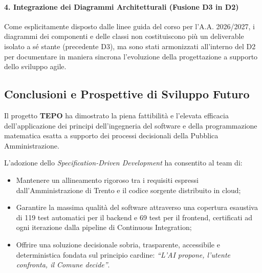 \paragraph{4. Integrazione dei Diagrammi Architetturali (Fusione D3 in D2)}
Come esplicitamente disposto dalle linee guida del corso per l'A.A. 2026/2027, i diagrammi dei componenti e delle classi non costituiscono più un deliverable isolato a sé stante (precedente D3), ma sono stati armonizzati all'interno del D2 per documentare in maniera sincrona l'evoluzione della progettazione a supporto dello sviluppo agile.

\subsection{Conclusioni e Prospettive di Sviluppo Futuro}
Il progetto \textbf{TEPO} ha dimostrato la piena fattibilità e l'elevata efficacia dell'applicazione dei principi dell'ingegneria del software e della programmazione matematica esatta a supporto dei processi decisionali della Pubblica Amministrazione.

L'adozione dello \emph{Specification-Driven Development} ha consentito al team di:
\begin{itemize}[leftmargin=1.5em, itemsep=0.2em]
    \item Mantenere un allineamento rigoroso tra i requisiti espressi dall'Amministrazione di Trento e il codice sorgente distribuito in cloud;
    \item Garantire la massima qualità del software attraverso una copertura esaustiva di 119 test automatici per il backend e 69 test per il frontend, certificati ad ogni iterazione dalla pipeline di Continuous Integration;
    \item Offrire una soluzione decisionale sobria, trasparente, accessibile e deterministica fondata sul principio cardine: \emph{``L'AI propone, l'utente confronta, il Comune decide''}.
\end{itemize}

